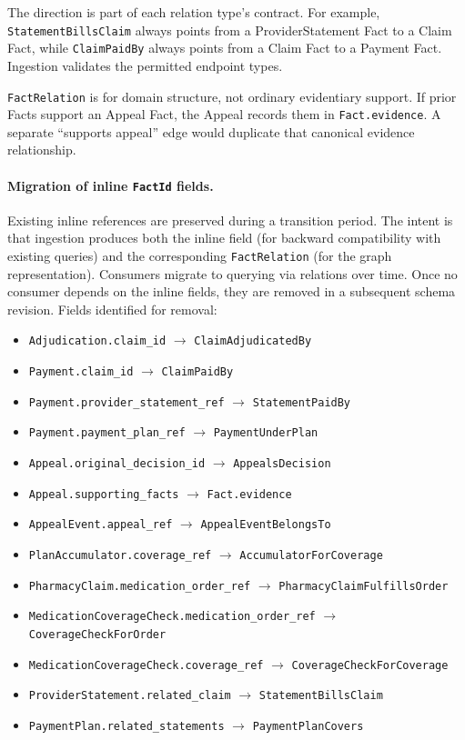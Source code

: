 \documentclass[11pt]{article}
\begin{document}
The direction is part of each relation type's contract. For example,
\texttt{StatementBillsClaim} always points from a ProviderStatement Fact to a
Claim Fact, while \texttt{ClaimPaidBy} always points from a Claim Fact to a
Payment Fact. Ingestion validates the permitted endpoint types.

\texttt{FactRelation} is for domain structure, not ordinary evidentiary
support. If prior Facts support an Appeal Fact, the Appeal records them in
\texttt{Fact.evidence}. A separate ``supports appeal'' edge would duplicate
that canonical evidence relationship.

\paragraph{Migration of inline \texttt{FactId} fields.}
Existing inline references are preserved during a transition period.
The intent is that ingestion produces both the inline field (for
backward compatibility with existing queries) and the corresponding
\texttt{FactRelation} (for the graph representation). Consumers migrate
to querying via relations over time. Once no consumer depends on the
inline fields, they are removed in a subsequent schema revision.
Fields identified for removal:

\begin{itemize}
\item \texttt{Adjudication.claim\_id} $\rightarrow$ \texttt{ClaimAdjudicatedBy}
\item \texttt{Payment.claim\_id} $\rightarrow$ \texttt{ClaimPaidBy}
\item \texttt{Payment.provider\_statement\_ref} $\rightarrow$ \texttt{StatementPaidBy}
\item \texttt{Payment.payment\_plan\_ref} $\rightarrow$ \texttt{PaymentUnderPlan}
\item \texttt{Appeal.original\_decision\_id} $\rightarrow$ \texttt{AppealsDecision}
\item \texttt{Appeal.supporting\_facts} $\rightarrow$ \texttt{Fact.evidence}
\item \texttt{AppealEvent.appeal\_ref} $\rightarrow$ \texttt{AppealEventBelongsTo}
\item \texttt{PlanAccumulator.coverage\_ref} $\rightarrow$ \texttt{AccumulatorForCoverage}
\item \texttt{PharmacyClaim.medication\_order\_ref} $\rightarrow$ \texttt{PharmacyClaimFulfillsOrder}
\item \texttt{MedicationCoverageCheck.medication\_order\_ref} $\rightarrow$ \texttt{CoverageCheckForOrder}
\item \texttt{MedicationCoverageCheck.coverage\_ref} $\rightarrow$ \texttt{CoverageCheckForCoverage}
\item \texttt{ProviderStatement.related\_claim} $\rightarrow$ \texttt{StatementBillsClaim}
\item \texttt{PaymentPlan.related\_statements} $\rightarrow$ \texttt{PaymentPlanCovers}
\end{itemize}
\end{document}
